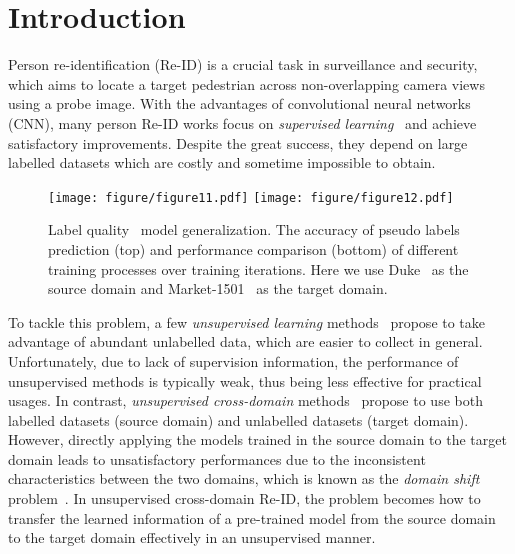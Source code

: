 \documentclass[10pt,twocolumn,letterpaper]{article}
\begin{document}
\section{Introduction}
Person re-identification (Re-ID) is a crucial task in surveillance and security, which aims to locate a target pedestrian across non-overlapping camera views using a probe image.
With the advantages of convolutional neural networks (CNN), many person Re-ID works focus on \emph{supervised learning}~\cite{DTL, PCB, AACN, mask2stream, CamStyle, MLFN, MTDnet, HA-CNN, svdnet, DPFL,paisitkriangkrai2015learning} and achieve satisfactory improvements. Despite the great success, they depend on large labelled datasets which are costly and
sometime impossible
to obtain.

\begin{figure}[t!]
\centering
\texttt{[image: figure/figure11.pdf]}
\texttt{[image: figure/figure12.pdf]}
\setlength{\abovecaptionskip}{0.1cm} 
\caption{Label quality \vs\ model generalization. The accuracy of pseudo labels prediction (top) and performance comparison (bottom) of different training processes over training iterations. Here we use Duke~\cite{duke} as the source domain and Market-1501~\cite{market1501} as the target domain.}
\label{fig:figure1}
\vspace{-5mm}
\end{figure}

To tackle this problem, 
a few \emph{unsupervised learning} methods~\cite{TJ-AIDL, stepwise, BUC} propose to take advantage of abundant unlabelled data, which are easier to collect in general. Unfortunately, due to lack of supervision information, the performance of unsupervised methods is typically weak, thus being less effective for practical usages.
In contrast, \emph{unsupervised cross-domain} methods~\cite{PTGAN, SPGAN, TJ-AIDL, HHL, EANet, UMDL, PUL, tfusion, ARN, theory} propose to use both labelled datasets (source domain) and unlabelled datasets (target domain).
However, directly applying the models trained in the source domain to the target domain leads to unsatisfactory performances due to the inconsistent characteristics between the two domains, which is known as the \emph{domain shift} problem~\cite{ARN}.
In unsupervised cross-domain Re-ID, the problem becomes how to transfer the learned information of a pre-trained model from the source domain to the target domain effectively in an unsupervised manner.
\end{document}
